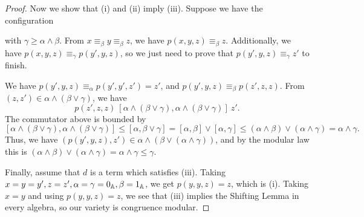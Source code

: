 \begin{appendices}
\begin{proof}
Now we show that (i) and (ii) imply (iii). Suppose we have the configuration
\begin{center}
\end{center}
with $\gamma \ge \alpha \wedge \beta$. From $x \equiv_\beta y \equiv_\beta z$, we have $p(x,y,z) \equiv_\beta z$. Additionally, we have $p(x,y,z) \equiv_\gamma p(y',y,z)$, so we just need to prove that $p(y',y,z) \equiv_\gamma z'$ to finish.

We have $p(y',y,z) \equiv_\alpha p(y',y',z') = z'$, and $p(y',y,z) \equiv_\beta p(z',z,z)$. From $(z,z') \in \alpha \wedge (\beta \vee \gamma)$, we have
\[
p(z',z,z)\ [\alpha\wedge (\beta\vee \gamma),\alpha \wedge (\beta \vee \gamma)]\ z'.
\]
The commutator above is bounded by
\[
[\alpha\wedge (\beta\vee \gamma),\alpha \wedge (\beta \vee \gamma)] \le [\alpha, \beta \vee \gamma] = [\alpha,\beta] \vee [\alpha,\gamma] \le (\alpha \wedge \beta) \vee (\alpha \wedge \gamma) = \alpha \wedge \gamma.
\]
Thus, we have $(p(y',y,z), z') \in \alpha \wedge (\beta \vee (\alpha \wedge \gamma))$, and by the modular law this is $(\alpha \wedge \beta) \vee (\alpha \wedge \gamma) = \alpha \wedge \gamma \le \gamma$.

Finally, assume that $d$ is a term which satisfies (iii). Taking $x = y = y', z = z', \alpha = \gamma = 0_{\mathbb{A}}, \beta = 1_{\mathbb{A}}$, we get $p(y,y,z) = z$, which is (i). Taking $x = y$ and using $p(y,y,z) = z$, we see that (iii) implies the Shifting Lemma in every algebra, so our variety is congruence modular.


\end{proof}
\end{appendices}
